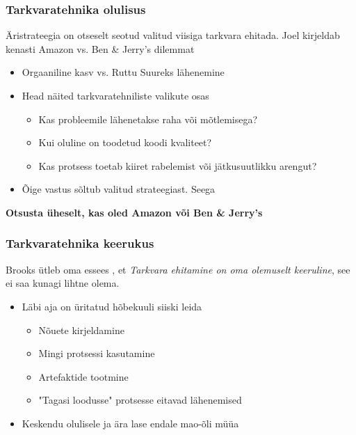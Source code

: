 \begin{frame}[fragile]
  \frametitle{Tarkvaratehnika olulisus}
  Äristrateegia on otseselt seotud valitud viisiga tarkvara ehitada. Joel \citep{spolsky2004joel2} kirjeldab kenasti Amazon vs. Ben \& Jerry's dilemmat
  \begin{itemize}
  	\item Orgaaniline kasv vs. Ruttu Suureks lähenemine
	\item Head näited tarkvaratehniliste valikute osas
		  \begin{itemize}
		  	\item Kas probleemile lähenetakse raha või mõtlemisega?
			\item Kui oluline on toodetud koodi kvaliteet?
			\item Kas protsess toetab kiiret rabelemist või jätkusuutlikku arengut?
		  \end{itemize}
	\item Õige vastus sõltub valitud strateegiast. Seega
  \end{itemize}
  \begin{center}
	  \textbf{Otsusta üheselt, kas oled Amazon või Ben \& Jerry's}
  \end{center}
\end{frame}

\begin{frame}[fragile]
  \frametitle{Tarkvaratehnika keerukus}
	Brooks ütleb oma essees \citep{brooks1975mythical}, et \emph{Tarkvara ehitamine on oma olemuselt keeruline}, see ei saa kunagi lihtne olema. 
  \begin{itemize}
	\item Läbi aja on üritatud hõbekuuli siiski leida
		  \begin{itemize}
		  	\item Nõuete kirjeldamine
			\item Mingi protsessi kasutamine
			\item Artefaktide tootmine
			\item "Tagasi loodusse" protsesse eitavad lähenemised
		  \end{itemize}
	\item Keskendu olulisele ja ära lase endale mao-õli müüa
  \end{itemize}
\end{frame}


